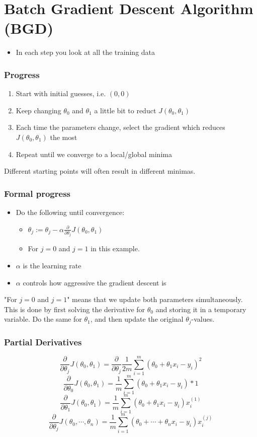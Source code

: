 \section{Batch Gradient Descent Algorithm (BGD)}
\begin{itemize}
    \item In each step you look at all the training data
\end{itemize}

\subsubsection{Progress}
\begin{enumerate}
    \item Start with initial guesses, i.e. $(0, 0)$
    \item Keep changing $\theta_0$ and $\theta_1$ a little bit to reduct $J(\theta_0, \theta_1)$
    \item Each time the parameters change, select the gradient which reduces $J(\theta_0, \theta_1)$ the most
    \item Repeat until we converge to a local/global minima
\end{enumerate}
Different starting points will often result in different minimas.

\subsubsection{Formal progress}
\begin{itemize}
    \item Do the following until convergence:
    \begin{itemize}
        \item $\theta_j:=\theta_j-\alpha\frac{\partial}{\partial\theta_j}J(\theta_0, \theta_1)$
        \item For $j=0$ and $j=1$ in this example.
    \end{itemize}
    \item $\alpha$ is the learning rate
    \item $\alpha$ controls how aggressive the gradient descent is
\end{itemize}

"For $j=0$ and $j=1$" means that we update both parameters simultaneously. This is done by first solving the derivative for $\theta_0$ and storing it in a temporary variable. Do the same for $\theta_1$, and then update the original $\theta_j$-values.

\subsubsection{Partial Derivatives}
\[
    \frac{\partial}{\partial \theta_j}J(\theta_0, \theta_1) = \frac{\partial}{\partial\theta_j}\frac{1}{2m}\sum_{i=1}^m(\theta_0+\theta_1x_i-y_i)^2
\]
\[
    \frac{\partial}{\partial \theta_0}J(\theta_0, \theta_1) = \frac{1}{m}\sum_{i=1}^m(\theta_0+\theta_1x_i-y_i)*1
\]
\[
    \frac{\partial}{\partial \theta_1}J(\theta_0, \theta_1) = \frac{1}{m}\sum_{i=1}^m(\theta_0+\theta_1x_i-y_i)x_i^{(1)}
\]
\[
    \frac{\partial}{\partial \theta_j}J(\theta_0, \cdots, \theta_n) = \frac{1}{m}\sum_{i=1}^m(\theta_0+\cdots+\theta_nx_i-y_i)x_i^{(j)}
\]

